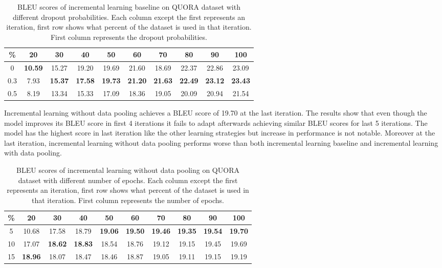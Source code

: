 \begin{table}[t]
\centering
\large
\begin{adjustbox}{width=1.2\textwidth,center=\textwidth} 
 \begin{tabular}{|c | c | c | c | c | c | c | c | c | c |} 
 \hline
 \% & 20 & 30 & 40 & 50 & 60 & 70 & 80 & 90 & 100 \\ [0.5ex] 
 \hline
  0 & \textbf{10.59} & 15.27 & 19.20 & 19.69 & 21.60 & 18.69 & 22.37 & 22.86 & 23.09  \\ 
 \hline
  0.3 & 7.93 & \textbf{15.37} & \textbf{17.58} & \textbf{19.73} & \textbf{21.20} & \textbf{21.63} & \textbf{22.49} & \textbf{23.12} & \textbf{23.43} \\ 
 \hline
  0.5 & 8.19 & 13.34 & 15.33 & 17.09 & 18.36 & 19.05 & 20.09 & 20.94 & 21.54 \\ 
 \hline
\end{tabular}
\end{adjustbox}
\caption{BLEU scores of incremental learning baseline on QUORA dataset with different dropout probabilities. Each column except the first represents an iteration, first row shows what percent of the dataset is used in that iteration. First column represents the dropout probabilities.}
\end{table}

Incremental learning without data pooling achieves a BLEU score of 19.70 at the last iteration. The results show that even though the model improves its BLEU score in first 4 iterations it fails to adapt afterwards achieving similar BLEU scores for last 5 iterations. The model has the highest score in last iteration like the other learning strategies but increase in performance is not notable. Moreover at the last iteration, incremental learning without data pooling performs worse than both incremental learning baseline and incremental learning with data pooling.

\begin{table}[b]
\centering
\large
\begin{adjustbox}{width=1.2\textwidth,center=\textwidth} 
 \begin{tabular}{|c | c | c | c | c | c | c | c | c | c |} 
 \hline
 \% & 20 & 30 & 40 & 50 & 60 & 70 & 80 & 90 & 100 \\ [0.5ex] 
 \hline
  5 & 10.68 & 17.58 & 18.79 & \textbf{19.06} & \textbf{19.50} & \textbf{19.46} & \textbf{19.35} & \textbf{19.54} & \textbf{19.70}  \\ 
 \hline
  10 & 17.07 & \textbf{18.62} & \textbf{18.83} & 18.54 & 18.76 & 19.12 & 19.15 & 19.45 & 19.69 \\ 
 \hline
 15 & \textbf{18.96} & 18.07 & 18.47 & 18.46 & 18.87 & 19.05 & 19.11 & 19.15 & 19.19 \\ 
 \hline
\end{tabular}
\end{adjustbox}
\caption{BLEU scores of incremental learning without data pooling on QUORA dataset with different number of epochs. Each column except the first represents an iteration, first row shows what percent of the dataset is used in that iteration. First column represents the number of epochs.}
\end{table}

